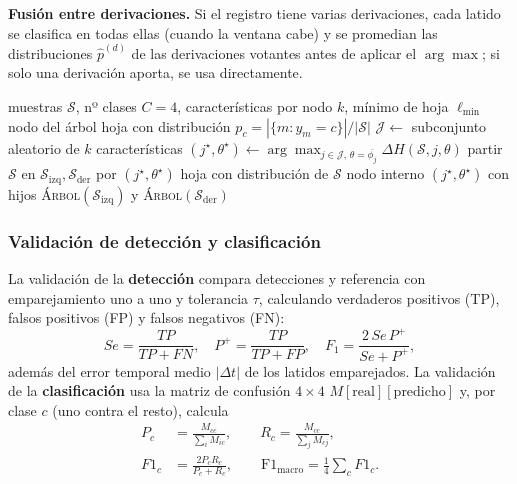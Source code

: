 \textbf{Fusión entre derivaciones.} Si el registro tiene varias derivaciones, cada latido se clasifica en todas ellas (cuando la ventana cabe) y se promedian las distribuciones $\hat{p}^{(d)}$ de las derivaciones votantes antes de aplicar el $\arg\max$; si solo una derivación aporta, se usa directamente.

\begin{algorithm}[H]
\small
\caption{Entrenamiento de un árbol del bosque (nodo $\mathcal{S}$)}
\label{alg:arbol}
\begin{algorithmic}[1]
\Require muestras $\mathcal{S}$, nº clases $C{=}4$, características por nodo $k$, mínimo de hoja $\ell_{\min}$
\Ensure nodo del árbol
  \State \Return hoja con distribución $p_c=|\{m:y_m=c\}|/|\mathcal{S}|$
\EndIf
\State $\mathcal{J}\leftarrow$ subconjunto aleatorio de $k$ características
\State $(j^\star,\theta^\star)\leftarrow\arg\max_{j\in\mathcal{J},\,\theta=\overline{\phi_j}}\Delta H(\mathcal{S},j,\theta)$
\State partir $\mathcal{S}$ en $\mathcal{S}_{\mathrm{izq}},\mathcal{S}_{\mathrm{der}}$ por $(j^\star,\theta^\star)$
  \State \Return hoja con distribución de $\mathcal{S}$
\EndIf
\State \Return nodo interno $(j^\star,\theta^\star)$ con hijos
  \textsc{Árbol}$(\mathcal{S}_{\mathrm{izq}})$ y \textsc{Árbol}$(\mathcal{S}_{\mathrm{der}})$
\end{algorithmic}
\end{algorithm}

\subsubsection{Validación de detección y clasificación}

La validación de la \textbf{detección} compara detecciones y referencia con emparejamiento uno a uno y tolerancia $\tau$, calculando verdaderos positivos (TP), falsos positivos (FP) y falsos negativos (FN):
\begin{equation}
Se=\frac{TP}{TP+FN},\quad P^{+}=\frac{TP}{TP+FP},\quad F_1=\frac{2\,Se\,P^{+}}{Se+P^{+}},
\end{equation}
además del error temporal medio $|\Delta t|$ de los latidos emparejados. La validación de la \textbf{clasificación} usa la matriz de confusión $4\times4$ $M[\text{real}][\text{predicho}]$ y, por clase $c$ (uno contra el resto), calcula
\begin{align}
P_c&=\frac{M_{cc}}{\sum_i M_{ic}},\qquad
R_c=\frac{M_{cc}}{\sum_j M_{cj}},\\
F1_c&=\frac{2P_cR_c}{P_c+R_c},\qquad
\text{F1}_{\text{macro}}=\frac14\sum_c F1_c.
\end{align}


